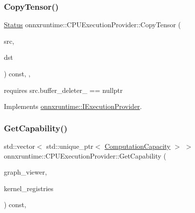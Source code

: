 \subsubsection{\texorpdfstring{Copy\+Tensor()}{CopyTensor()}}
{\footnotesize\ttfamily \mbox{\hyperlink{classonnxruntime_1_1common_1_1Status}{Status}} onnxruntime\+::\+C\+P\+U\+Execution\+Provider\+::\+Copy\+Tensor (\begin{DoxyParamCaption}\item[{const \mbox{\hyperlink{classonnxruntime_1_1Tensor}{Tensor}} \&}]{src,  }\item[{\mbox{\hyperlink{classonnxruntime_1_1Tensor}{Tensor}} \&}]{dst }\end{DoxyParamCaption}) const\hspace{0.3cm}{\ttfamily [inline]}, {\ttfamily [override]}, {\ttfamily [virtual]}}



requires src.\+buffer\+\_\+deleter\+\_\+ == nullptr 



Implements \mbox{\hyperlink{classonnxruntime_1_1IExecutionProvider_a2b9bb47c0d2d72598ceb381688adfe26}{onnxruntime\+::\+I\+Execution\+Provider}}.

\mbox{\label{classonnxruntime_1_1CPUExecutionProvider_a5c6c0ee34c9768248d2bcb5f5b0aea70}} 
\subsubsection{\texorpdfstring{Get\+Capability()}{GetCapability()}}
{\footnotesize\ttfamily std\+::vector$<$ std\+::unique\+\_\+ptr$<$ \mbox{\hyperlink{structonnxruntime_1_1ComputationCapacity}{Computation\+Capacity}} $>$ $>$ onnxruntime\+::\+C\+P\+U\+Execution\+Provider\+::\+Get\+Capability (\begin{DoxyParamCaption}\item[{const \mbox{\hyperlink{classonnxruntime_1_1GraphViewer}{onnxruntime\+::\+Graph\+Viewer}} \&}]{graph\+\_\+viewer,  }\item[{const std\+::vector$<$ const \mbox{\hyperlink{classonnxruntime_1_1KernelRegistry}{Kernel\+Registry}} $\ast$$>$ \&}]{kernel\+\_\+registries }\end{DoxyParamCaption}) const\hspace{0.3cm}{\ttfamily [override]}, {\ttfamily [virtual]}}

